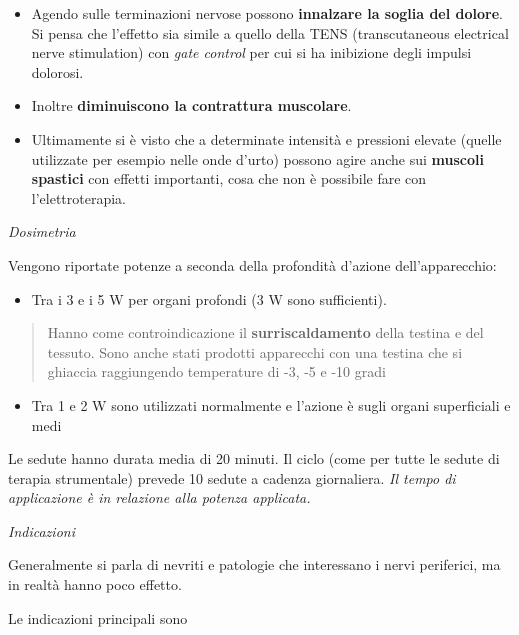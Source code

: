 \documentclass[]{article}
\begin{document}
\begin{itemize}
\item
  Agendo sulle terminazioni nervose possono \textbf{innalzare la soglia
  del dolore}. Si pensa che l'effetto sia simile a quello della TENS
  (transcutaneous electrical nerve stimulation) con \emph{gate control}
  per cui si ha inibizione degli impulsi dolorosi.
\item
  Inoltre \textbf{diminuiscono la contrattura muscolare}.
\item
  Ultimamente si è visto che a determinate intensità e pressioni elevate
  (quelle utilizzate per esempio nelle onde d'urto) possono agire anche
  sui \textbf{muscoli spastici} con effetti importanti, cosa che non è
  possibile fare con l'elettroterapia.
\end{itemize}

\emph{Dosimetria}

Vengono riportate potenze a seconda della profondità d'azione
dell'apparecchio:

\begin{itemize}
\item
  Tra i 3 e i 5 W per organi profondi (3 W sono sufficienti).
\end{itemize}

\begin{quote}
Hanno come controindicazione il \textbf{surriscaldamento} della testina
e del tessuto. Sono anche stati prodotti apparecchi con una testina che
si ghiaccia raggiungendo temperature di -3, -5 e -10 gradi
\end{quote}

\begin{itemize}
\item
  Tra 1 e 2 W sono utilizzati normalmente e l'azione è sugli organi
  superficiali e medi
\end{itemize}

Le sedute hanno durata media di 20 minuti. Il ciclo (come per tutte le
sedute di terapia strumentale) prevede 10 sedute a cadenza giornaliera.
\emph{Il tempo di applicazione è in relazione alla potenza applicata.}

\emph{Indicazioni}

Generalmente si parla di nevriti e patologie che interessano i nervi
periferici, ma in realtà hanno poco effetto.

Le indicazioni principali sono
\end{document}
